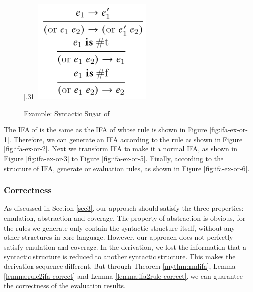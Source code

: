 \begin{figure}[t]
{    }
    [.31\linewidth]{
        \includegraphics[scale=0.3]{images/ifa/ifa-ex-or-6.png}
    }
    \caption{Example: Syntactic Sugar of }
    \label{fig:ifa-nand-std}
\end{figure}

The IFA of  is the same as the IFA of  whose rule is shown in Figure \ref{fig:ifa-ex-or-1}. Therefore, we can generate an IFA according to the rule as shown in Figure \ref{fig:ifa-ex-or-2}. Next we transform IFA to make it a normal IFA, as shown in Figure \ref{fig:ifa-ex-or-3} to Figure \ref{fig:ifa-ex-or-5}. Finally, according to the structure of IFA, generate or evaluation rules, as shown in Figure \ref{fig:ifa-ex-or-6}.


\subsubsection{Correctness}

As discussed in Section \ref{sec3}, our approach should satisfy the three properties: emulation, abstraction and coverage. The property of abstraction is obvious, for the rules we generate only contain the syntactic structure itself, without any other structures in core language. However, our approach does not perfectly satisfy emulation and coverage. In the derivation, we lost the information that a syntactic structure is reduced to another syntactic structure. This makes the derivation sequence different. But through Theorem \ref{mythm:nmlifa}, Lemma \ref{lemma:rule2ifa-correct} and Lemma \ref{lemma:ifa2rule-correct}, we can guarantee the correctness of the evaluation results.
